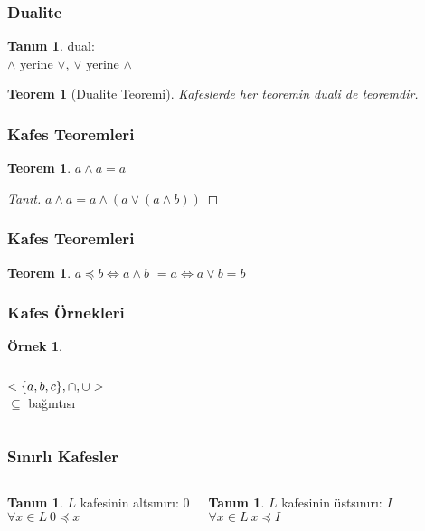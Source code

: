 \documentclass[dvipsnames]{beamer}
\theoremstyle{definition}
\newtheorem{tanim}[theorem]{Tanım}
\theoremstyle{example}
\newtheorem{ornek}[theorem]{Örnek}
\theoremstyle{plain}
\newtheorem{teorem}[theorem]{Teorem}
\begin{document}
\begin{frame}
  \frametitle{Dualite}

  \begin{tanim}
    \alert{dual}:\\
    $\wedge$ yerine $\vee$, $\vee$ yerine $\wedge$
  \end{tanim}

  \pause
  \begin{teorem}[Dualite Teoremi]
    Kafeslerde her teoremin duali de teoremdir.
  \end{teorem}
\end{frame}

\begin{frame}
  \frametitle{Kafes Teoremleri}

  \begin{teorem}
    $a \wedge a = a$
  \end{teorem}

  \pause
  \begin{proof}[Tanıt]
    $a \wedge a = a \wedge (a \vee (a \wedge b))$
  \end{proof}
\end{frame}

\begin{frame}
  \frametitle{Kafes Teoremleri}

  \begin{teorem}
    $a \preceq b \Leftrightarrow a \wedge b$
    $ = a \Leftrightarrow a \vee b = b$
  \end{teorem}
\end{frame}

\begin{frame}
  \frametitle{Kafes Örnekleri}

  \begin{ornek}
    \begin{columns}
      $<\mathcal\{a,b,c\},\cap,\cup>$\\
      $\subseteq$ bağıntısı

      \begin{center}
      \end{center}
    \end{columns}
  \end{ornek}
\end{frame}

\begin{frame}
  \frametitle{Sınırlı Kafesler}

  \begin{columns}[t]
    \begin{tanim}
      $L$ kafesinin altsınırı: $0$\\
      $\forall x \in L~0 \preceq x$
    \end{tanim}

    \pause
    \begin{tanim}
      $L$ kafesinin üstsınırı: $I$\\
      $\forall x \in L~x \preceq I$
    \end{tanim}
  \end{columns}
\end{frame}
\end{document}
